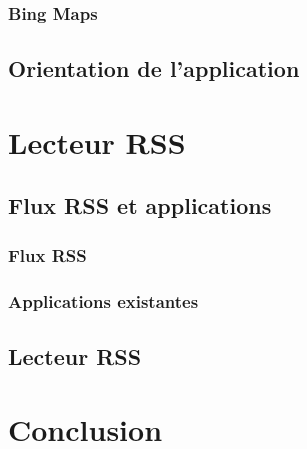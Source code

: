 \documentclass[twoside,UTF8]{EPURapport}
\begin{document}
		\subsection{Bing Maps}
	\section{Orientation de l'application}
		

\chapter{Lecteur RSS}
	\section{Flux RSS et applications}
		\subsection{Flux RSS}
		
		\subsection{Applications existantes}

	\section{Lecteur RSS}
	


\chapter{Conclusion}

\annexes
\end{document}
